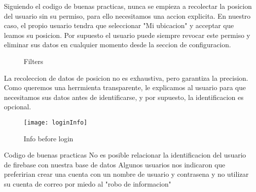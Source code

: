 Siguiendo el codigo de buenas practicas, nunca se empieza a recolectar la posicion del usuario sin su permiso,
para ello necesitamos una accion explicita. En nuestro caso, el propio usuario tendra que seleccionar "Mi 
ubicacion" y acceptar que leamos su posicion. Por supuesto el usuario puede siempre revocar este permiso y 
eliminar sus datos en cualquier momento desde la seccion de configuracion.\\

\newpage
\begin{figure}[ht]
    \centering
    \hfill
   
  \caption{Filters}
    \end{figure}

La recoleccion de datos de posicion no es exhaustiva, pero garantiza la precision.\\

Como queremos una herrmienta transparente, le explicamos al usuario para que necesitamos sus datos antes
de identificarse, y por supuesto, la identificacion es opcional.\\


\begin{figure}[ht]
    \centering
    \texttt{[image: loginInfo]}
    \caption{Info before login}
\end{figure}


\begin{itemize}
    \done Codigo de buenas practicas
    \done No es posible relacionar la identificacion del usuario de firebase con nuestra base de datos
    \crossed Algunos usuarios nos indicaron que preferirian crear una cuenta con un nombre de usuario y contrasena
    y no utilizar su cuenta de correo por miedo al "robo de informacion"
    
\end{itemize}
\newpage